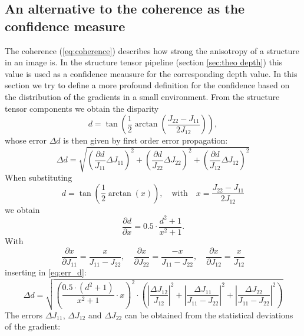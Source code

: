 \documentclass  [
  paper    = a4,
  BCOR     = 10mm,
  twoside,
  fontsize = 12pt,
  fleqn,
  toc      = bibnumbered,
  toc      = listofnumbered,
  numbers  = noendperiod,
  headings = normal,
  listof   = leveldown,
  version  = 3.03
]                                       {scrreprt}
\begin{document}
 \subsection{An alternative to the coherence as the confidence measure}
 \label{sec:alternative}
 The coherence (\ref{eq:coherence}) describes how strong the anisotropy of a structure in an image is. In the structure tensor pipeline (section \ref{sec:theo depth}) this value is used as a confidence meausure for the corresponding depth value. In this section we try to define a more profound definition for the confidence based on the distribution of the gradients in a small environment.
 From the structure tensor components we obtain the disparity 
 \begin{equation}\label{eq:disparity2}
 d = \tan\left(\frac{1}{2} \arctan\left( \frac{J_{22}-J_{11}}{2J_{12}}\right)\right),
 \end{equation}
 whose error $\Delta d$ is then given by first order error propagation:
 \begin{equation}\label{eq:err_d}
 \Delta d = \sqrt{\left(\frac{\partial d}{J_{11}}  \Delta J_{11}\right)^2 + \left(\frac{\partial d}{J_{22}}  \Delta J_{22}\right)^2 + \left(\frac{\partial d}{J_{12}} \Delta J_{12}\right)^2 }
 \end{equation}
 When substituting
 \begin{equation}\label{eq:disparity2}
 d = \tan\left(\frac{1}{2} \arctan\left( x\right)\right),\quad \text{with}\quad  x = \frac{J_{22}-J_{11}}{2J_{12}}
 \end{equation}
 we obtain
 \begin{equation}\label{key}
 \frac{\partial d}{\partial x} = 0.5\cdot \frac{d^2+1}{x^2+1}.
 \end{equation}
 With
 \begin{equation}\label{key}
 \frac{\partial x}{\partial J_{11}} = \frac{x}{J_{11} - J_{22}},\quad \frac{\partial x}{\partial J_{22}} = \frac{-x}{J_{11} - J_{22}},\quad  \frac{\partial x}{\partial J_{12}} = \frac{x}{J_{12}}
 \end{equation}
 inserting in \ref{eq:err_d}:
 \begin{equation}\label{eq:deviation_d}
 \Delta d =\sqrt{\left(\frac{0.5\cdot(d^2+1)}{x^2+1}\cdot x\right)^2 \cdot \left(\left|\frac{\Delta J_{12}}{J_{12}}\right|^2 + \left|\frac{\Delta J_{11}}{J_{11}-J_{22}}\right|^2 + \left|\frac{\Delta J_{22}}{J_{11}-J_{22}}\right|^2\right)}
 \end{equation}
 The errors $\Delta J_{11}$, $\Delta J_{12}$ and $\Delta J_{22}$ can be obtained from the statistical deviations of the gradient:
\end{document}
